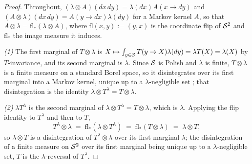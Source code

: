 \begin{proof} Throughout, $(\lambda\otimes A)(dx\,dy)=\lambda(dx)A(x\rightarrow dy)$ and $(A\otimes\lambda)(dx\,dy)=A(y\rightarrow dx)\lambda(dy)$ for a Markov kernel $A$, so that $A\otimes\lambda=\mathrm{fl}_*(\lambda\otimes A)$, where $\mathrm{fl}(x,y):=(y,x)$ is the coordinate flip of $\mathcal S^2$ and $\mathrm{fl}_*$ the image measure it induces.

\emph{(1)} The first marginal of $T\otimes\lambda$ is $X\mapsto \int_{y\in\mathcal S}T(y\rightarrow X)\lambda(dy)=\lambda T(X)=\lambda(X)$ by $T$-invariance, and its second marginal is $\lambda$. Since $\mathcal S$ is Polish and $\lambda$ is finite, $T\otimes\lambda$ is a finite measure on a standard Borel space, so it disintegrates over its first marginal into a Markov kernel, unique up to a $\lambda$-negligible set \cite{halmos2013measureHaar}; that disintegration is the identity $\lambda\otimes T^\lambda = T\otimes\lambda$.

\emph{(2)} $\lambda T^\lambda$ is the second marginal of $\lambda\otimes T^\lambda=T\otimes\lambda$, which is $\lambda$. Applying the flip identity to $T^\lambda$ and then to $T$,
\begin{equation}\label{eq:reversal_flip}
    T^\lambda\otimes\lambda \;=\; \mathrm{fl}_*(\lambda\otimes T^\lambda) \;=\; \mathrm{fl}_*(T\otimes\lambda) \;=\; \lambda\otimes T,
\end{equation}
so $\lambda\otimes T$ is a disintegration of $T^\lambda\otimes\lambda$ over its first marginal $\lambda$; the disintegration of a finite measure on $\mathcal S^2$ over its first marginal being unique up to a $\lambda$-negligible set, $T$ is the $\lambda$-reversal of $T^\lambda$.


\end{proof}
